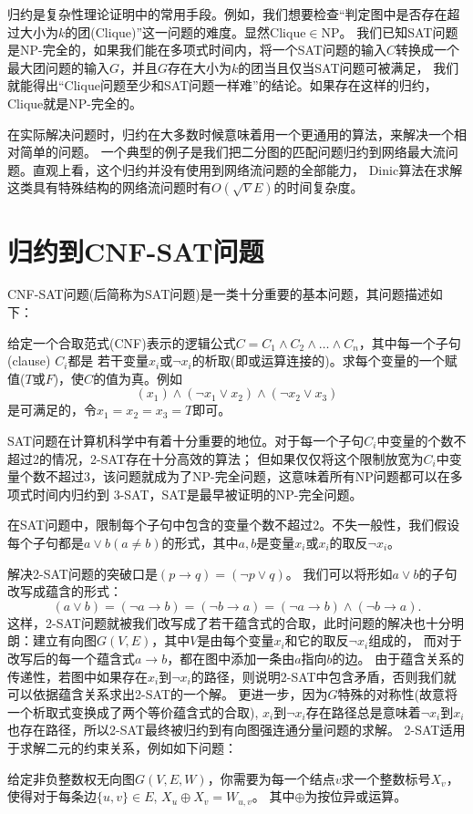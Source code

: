 归约是复杂性理论证明中的常用手段。例如，我们想要检查``判定图中是否存在超过大小为$k$的团(Clique)''这一问题的难度。显然$\mathrm{Clique}\in\mathrm{NP}$。
我们已知SAT问题是NP-完全的，如果我们能在多项式时间内，将一个SAT问题的输入$C$转换成一个最大团问题的输入$G$，并且$G$存在大小为$k$的团当且仅当SAT问题可被满足，
我们就能得出``Clique问题至少和SAT问题一样难''的结论。如果存在这样的归约，Clique就是NP-完全的。

在实际解决问题时，归约在大多数时候意味着用一个更通用的算法，来解决一个相对简单的问题。
一个典型的例子是我们把二分图的匹配问题归约到网络最大流问题。直观上看，这个归约并没有使用到网络流问题的全部能力，
Dinic算法在求解这类具有特殊结构的网络流问题时有$O(\sqrt{V} E)$的时间复杂度。


\section{归约到CNF-SAT问题}

CNF-SAT问题(后简称为SAT问题)是一类十分重要的基本问题，其问题描述如下：

\begin{prob}
 给定一个合取范式(CNF)表示的逻辑公式$C = C_1 \land C_2 \land \ldots \land C_n$，其中每一个子句(clause) $C_i$都是
 若干变量$x_i$或$\neg x_i$的析取(即或运算连接的)。求每个变量的一个赋值($T$或$F$)，使$C$的值为真。例如
 $$(x_1)\land(\neg x_1 \lor x_2)\land(\neg x_2 \lor x_3)$$
 是可满足的，令$x_1=x_2=x_3=T$即可。
\end{prob}

SAT问题在计算机科学中有着十分重要的地位。对于每一个子句$C_i$中变量的个数不超过2的情况，2-SAT存在十分高效的算法；
但如果仅仅将这个限制放宽为$C_i$中变量个数不超过3，该问题就成为了NP-完全问题，这意味着所有NP问题都可以在多项式时间内归约到
3-SAT，SAT是最早被证明的NP-完全问题。

\begin{prob}[2-SAT]
 在SAT问题中，限制每个子句中包含的变量个数不超过2。不失一般性，我们假设每个子句都是$a\lor b (a \neq b)$的形式，其中$a, b$是变量$x_i$或$x_i$的取反$\neg x_i$。
\end{prob}

解决2-SAT问题的突破口是$(p\to q) = (\neg p \lor q)$。
我们可以将形如$a\lor b$的子句改写成蕴含的形式：$$(a\lor b) = (\neg a \to b) = (\neg b \to a) = (\neg a \to b) \land (\neg b \to a).$$
这样，2-SAT问题就被我们改写成了若干蕴含式的合取，此时问题的解决也十分明朗：建立有向图$G(V,E)$，其中$V$是由每个变量$x_i$和它的取反$\neg x_i$组成的，
而对于改写后的每一个蕴含式$a\to b$，都在图中添加一条由$a$指向$b$的边。
由于蕴含关系的传递性，若图中如果存在$x_i$到$\neg x_i$的路径，则说明2-SAT中包含矛盾，否则我们就可以依据蕴含关系求出2-SAT的一个解。
更进一步，因为$G$特殊的对称性(故意将一个析取式变换成了两个等价蕴含式的合取), $x_i$到$\neg x_i$存在路径总是意味着$\neg x_i$到$x_i$也存在路径，所以2-SAT最终被归约到有向图强连通分量问题的求解。
2-SAT适用于求解二元的约束关系，例如如下问题：
\begin{prob}
 给定非负整数权无向图$G(V, E, W)$，你需要为每一个结点$v$求一个整数标号$X_v$，使得对于每条边$\{u, v\}\in E$, $X_u \oplus X_v = W_{u,v}$。
 其中$\oplus$为按位异或运算。
\end{prob}

